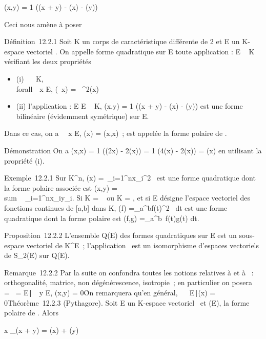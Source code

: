 \documentclass[]{article}
\begin{document}
\phi(x,y) = 1  (\Phi(x + y) - \Phi(x) - \Phi(y))

Ceci nous amène à poser

Définition~12.2.1 Soit K un corps de caractéristique différente de 2 et
E un K-espace vectoriel . On appelle forme quadratique sur E toute
application \Phi : E \rightarrow~ K vérifiant les deux propriétés

\begin{itemize}
\itemsep1pt\parskip0pt
\item
  (i) \forall~\lambda~ \in K, \\forall~~x \in
  E, \Phi(\lambda~x) = \lambda~^2\Phi(x)
\item
  (ii) l'application \phi : E \times E \rightarrow~ K, \phi(x,y) = 1  (\Phi(x + y) - \Phi(x) - \Phi(y)) est une forme bilinéaire (évidemment
  symétrique) sur E.
\end{itemize}

Dans ce cas, on a \forall~~x \in E, \Phi(x) = \phi(x,x)~; \phi
est appelée la forme polaire de \Phi.

Démonstration On a \phi(x,x) = 1  (\Phi(2x) - 2\Phi(x))
= 1  (4\Phi(x) - 2\Phi(x)) = \Phi(x) en utilisant la
propriété (i).

Exemple~12.2.1 Sur K^n, \Phi(x) =\
\sum  \_i=1^nx\_i^2~
est une forme quadratique dont la forme polaire associée est \phi(x,y)
= \\sum ~
\_i=1^nx\_iy\_i. Si K = ~ ou K = , et si E
désigne l'espace vectoriel des fonctions continues de {[}a,b{]} dans K,
\Phi(f) =\int  \_a^bf(t)^2~
dt est une forme quadratique dont la forme polaire est \phi(f,g)
=\int  \_a^b~f(t)g(t) dt.

Proposition~12.2.2 L'ensemble Q(E) des formes quadratiques sur E est un
sous-espace vectoriel de K^E~; l'application
\phi\mapsto~\Phi est un isomorphisme d'espaces vectoriels
de S\_2(E) sur Q(E).

Remarque~12.2.2 Par la suite on confondra toutes les notions relatives à
\phi et à \Phi~: orthogonalité, matrice, non dégénérescence, isotropie~; en
particulier on posera
\mathrmKer~\Phi
= \mathrmKer~\phi =
\x \in
E∣\forall~~y \in E, \phi(x,y) =
0\. On remarquera qu'en général,
\mathrmKer\Phi\mathrel\neq~~\x
\in E∣\Phi(x) = 0\.

Théorème~12.2.3 (Pythagore). Soit E un K-espace vectoriel ~et \Phi \inQ(E), \phi
la forme polaire de \Phi. Alors

x \bot\_\phiy \Leftrightarrow \Phi(x + y) = \Phi(x) + \Phi(y)
\end{document}

